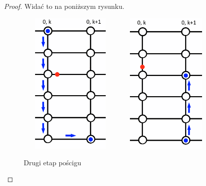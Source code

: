 \documentclass[brudnopis]{xmgr}
\theoremstyle{definition}
\begin{document}
\begin{proof}
	Widać to na poniższym rysunku. 
	\begin{figure}[ht!]
	  \centering
	  \includegraphics[width=5cm,height=7cm]{rysunki/poscig_2.png}
    \includegraphics[width=5cm,height=7cm]{rysunki/poscig_3.png}
	  \caption{Drugi etap pościgu}
	  \label{fig:drugi krok}
	\end{figure}


\end{proof}
\end{document}
